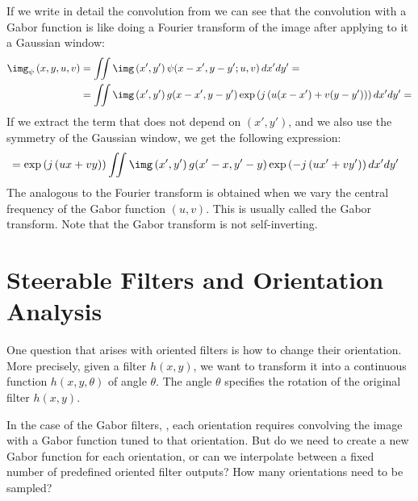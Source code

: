 If we write in detail the convolution from \eqn{\ref{eq:gaborconv}} we can see that the convolution with a Gabor function is like doing a Fourier transform of the image after applying to it a Gaussian window:
\begin{equation*}
\begin{split}
\img_{\psi} \left(x,y,u,v \right)  & =   \iint \img \left(x',y'\right) \psi(x-x',y-y';u,v) \, dx' dy' = \\
& = \iint  \img \left(x',y'\right) g(x-x',y-y') \exp \left( j \left(u (x-x') + v (y-y') \right) \right) dx' dy' = \\
\end{split}
\end{equation*}
If we extract the term that does not depend on $(x',y')$, and we also use the symmetry of the Gaussian window, we get the following expression:
\begin{equation}
\begin{split}
& = \exp \left( j \left(u x + v y \right) \right) \iint \img \left(x',y'\right) g(x'-x,y'-y) \exp \left(- j \left(u x' + v y' \right) \right) dx' dy'
\end{split}
\end{equation}
The analogous to the Fourier transform is obtained when we vary the central frequency of the Gabor function $(u,v)$. This is usually called the Gabor transform. Note that the Gabor transform is not self-inverting. 



\section{Steerable Filters and Orientation Analysis}


One question that arises with oriented filters is how to change their
orientation.  More precisely, given a filter $h(x,y)$, we want to transform it into a continuous function $h(x,y, \theta)$ of angle $\theta$. The angle $\theta$ specifies the rotation of the original filter $h(x,y)$.

In the case of the Gabor filters, \eqn{\ref{eq:gaborcomplexfilter}}, each orientation requires convolving the image with a Gabor function tuned to that orientation. But do we need to create a new Gabor function for each orientation, or can we interpolate between a fixed number of predefined oriented filter outputs? How many orientations need to be sampled?



